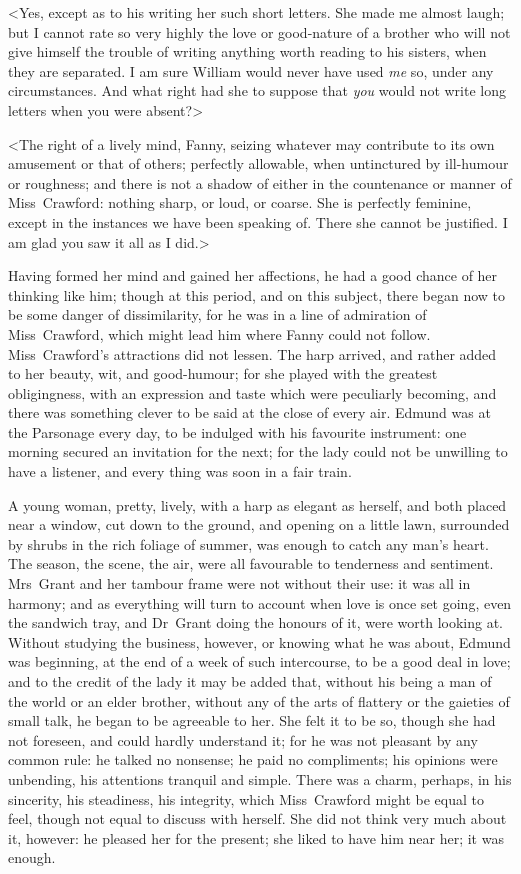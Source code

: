 <Yes, except as to his writing her such short letters. She made me almost laugh; but I cannot rate so very highly the love or good-nature of a brother who will not give himself the trouble of writing anything worth reading to his sisters, when they are separated. I am sure William would never have used \textit{me}  so, under any circumstances. And what right had she to suppose that \textit{you}  would not write long letters when you were absent?>

<The right of a lively mind, Fanny, seizing whatever may contribute to its own amusement or that of others; perfectly allowable, when untinctured by ill-humour or roughness; and there is not a shadow of either in the countenance or manner of Miss~Crawford: nothing sharp, or loud, or coarse. She is perfectly feminine, except in the instances we have been speaking of. There she cannot be justified. I am glad you saw it all as I did.>

Having formed her mind and gained her affections, he had a good chance of her thinking like him; though at this period, and on this subject, there began now to be some danger of dissimilarity, for he was in a line of admiration of Miss~Crawford, which might lead him where Fanny could not follow. Miss~Crawford's attractions did not lessen. The harp arrived, and rather added to her beauty, wit, and good-humour; for she played with the greatest obligingness, with an expression and taste which were peculiarly becoming, and there was something clever to be said at the close of every air. Edmund was at the Parsonage every day, to be indulged with his favourite instrument: one morning secured an invitation for the next; for the lady could not be unwilling to have a listener, and every thing was soon in a fair train.

A young woman, pretty, lively, with a harp as elegant as herself, and both placed near a window, cut down to the ground, and opening on a little lawn, surrounded by shrubs in the rich foliage of summer, was enough to catch any man's heart. The season, the scene, the air, were all favourable to tenderness and sentiment. Mrs~Grant and her tambour frame were not without their use: it was all in harmony; and as everything will turn to account when love is once set going, even the sandwich tray, and Dr~Grant doing the honours of it, were worth looking at. Without studying the business, however, or knowing what he was about, Edmund was beginning, at the end of a week of such intercourse, to be a good deal in love; and to the credit of the lady it may be added that, without his being a man of the world or an elder brother, without any of the arts of flattery or the gaieties of small talk, he began to be agreeable to her. She felt it to be so, though she had not foreseen, and could hardly understand it; for he was not pleasant by any common rule: he talked no nonsense; he paid no compliments; his opinions were unbending, his attentions tranquil and simple. There was a charm, perhaps, in his sincerity, his steadiness, his integrity, which Miss~Crawford might be equal to feel, though not equal to discuss with herself. She did not think very much about it, however: he pleased her for the present; she liked to have him near her; it was enough.

